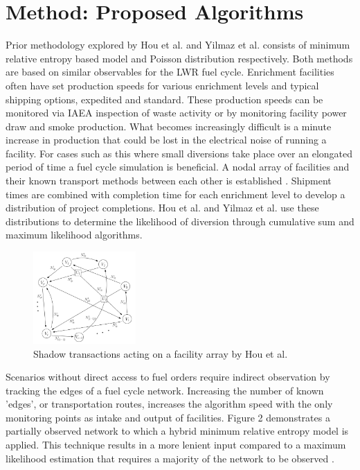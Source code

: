 \documentclass{anstrans}
\begin{document}
\section{Method: Proposed Algorithms}
Prior methodology explored by Hou et al. and Yilmaz et al. \cite{Hou_2016,Yilmaz_2016} consists of minimum relative entropy based model and Poisson distribution respectively. Both methods are based on similar observables for the LWR fuel cycle. Enrichment facilities often have set production speeds for various enrichment levels and typical shipping options, expedited and standard. These production speeds can be monitored via IAEA inspection of waste activity or by monitoring facility power draw and smoke production. What becomes increasingly difficult is a minute increase in production that could be lost in the electrical noise of running a facility. For cases such as this where small diversions take place over an elongated period of time a fuel cycle simulation is beneficial. A nodal array of facilities and their known transport methods between each other is established \cite{Hou_2016}. Shipment times are combined with completion time for each enrichment level to develop a distribution of project completions. Hou et al. and Yilmaz et al. use these distributions to determine the likelihood of diversion through cumulative sum and maximum likelihood algorithms.

\begin{figure}[ht] %
	\centering
	\includegraphics[width=0.35\textwidth]{Hou_Network}
	\caption{Shadow transactions acting on a facility array by Hou et al\cite{Hou_2016}.}
	\label{fig:maximumlikelihood}
\end{figure}

 Scenarios without direct access to fuel orders require indirect observation by tracking the edges of a fuel cycle network. Increasing the number of known 'edges', or transportation routes, increases the algorithm speed with the only monitoring points as intake and output of facilities. Figure 2 demonstrates a partially observed network to which a hybrid minimum relative entropy model is applied. This technique results in a more lenient input compared to a maximum likelihood estimation that requires a majority of the network to be observed \cite{Hou_2016}.
\end{document}
